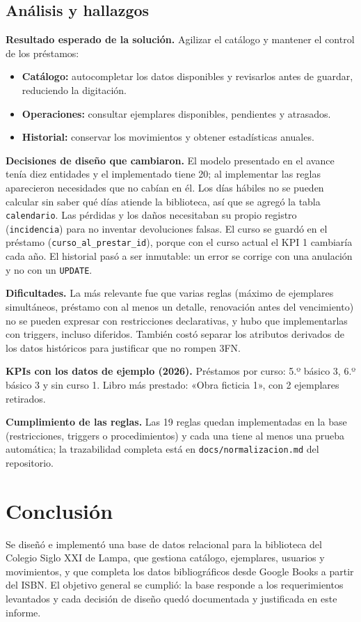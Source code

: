 \documentclass[11pt,a4paper]{article}
\begin{document}
\subsection{Análisis y hallazgos}
\textbf{Resultado esperado de la solución.} Agilizar el catálogo y mantener el control de los préstamos:
\begin{itemize}[nosep]
\item \textbf{Catálogo:} autocompletar los datos disponibles y revisarlos antes de guardar, reduciendo la digitación.
\item \textbf{Operaciones:} consultar ejemplares disponibles, pendientes y atrasados.
\item \textbf{Historial:} conservar los movimientos y obtener estadísticas anuales.
\end{itemize}

\textbf{Decisiones de diseño que cambiaron.} El modelo presentado en el avance tenía diez entidades y el implementado tiene 20; al implementar las reglas aparecieron necesidades que no cabían en él. Los días hábiles no se pueden calcular sin saber qué días atiende la biblioteca, así que se agregó la tabla \texttt{calendario}. Las pérdidas y los daños necesitaban su propio registro (\texttt{incidencia}) para no inventar devoluciones falsas. El curso se guardó en el préstamo (\texttt{curso\_al\_prestar\_id}), porque con el curso actual el KPI 1 cambiaría cada año. El historial pasó a ser inmutable: un error se corrige con una anulación y no con un \texttt{UPDATE}.

\textbf{Dificultades.} La más relevante fue que varias reglas (máximo de ejemplares simultáneos, préstamo con al menos un detalle, renovación antes del vencimiento) no se pueden expresar con restricciones declarativas, y hubo que implementarlas con triggers, incluso diferidos. También costó separar los atributos derivados de los datos históricos para justificar que no rompen 3FN.

\textbf{KPIs con los datos de ejemplo (2026).} Préstamos por curso: 5.º básico 3, 6.º básico 3 y sin curso 1. Libro más prestado: «Obra ficticia 1», con 2 ejemplares retirados.

\textbf{Cumplimiento de las reglas.} Las 19 reglas quedan implementadas en la base (restricciones, triggers o procedimientos) y cada una tiene al menos una prueba automática; la trazabilidad completa está en \texttt{docs/normalizacion.md} del repositorio.

\section{Conclusión}
Se diseñó e implementó una base de datos relacional para la biblioteca del Colegio Siglo XXI de Lampa, que gestiona catálogo, ejemplares, usuarios y movimientos, y que completa los datos bibliográficos desde Google Books a partir del ISBN. El objetivo general se cumplió: la base responde a los requerimientos levantados y cada decisión de diseño quedó documentada y justificada en este informe.
\end{document}
